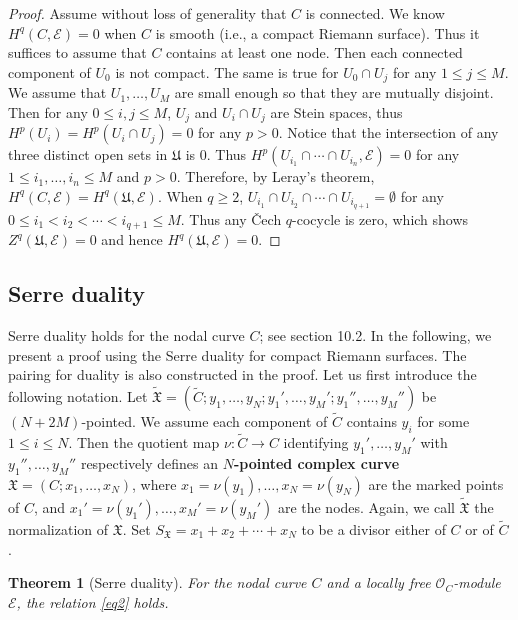 \documentclass[12pt,b5paper,notitlepage]{report}
\theoremstyle{definition}
\theoremstyle{plain}
\newtheorem{thm}[df]{Theorem}
\newcommand{\fk}{\mathfrak}
\newcommand{\wtd}{\widetilde}
\newcommand{\scr}{\mathscr}
\newcommand{\SX}{S_{\fk X}}
\numberwithin{equation}{section}
\begin{document}
\begin{proof}
Assume without loss of generality that $C$ is connected. We know  $H^q(C,\scr E)=0$ when $C$ is smooth (i.e., a compact Riemann surface). Thus it suffices to assume that $C$ contains at least one node. Then each connected component of $U_0$ is not compact. The same is true for $U_0\cap U_j$ for any $1\leq j\leq M$. We assume that $U_1,\dots,U_M$ are small enough so that they are mutually disjoint. Then for any $0\leq i,j\leq M$, $U_j$ and $U_i\cap U_j$ are Stein spaces, thus $H^p(U_i)=H^p(U_i\cap U_j)=0$ for any $p> 0$. Notice that the intersection of any three distinct open sets in $\fk U$ is $0$. Thus $H^p(U_{i_1}\cap\cdots \cap U_{i_n},\scr E)=0$ for any $1\leq i_1,\dots, i_n\leq M$ and $p>0$. Therefore, by Leray's theorem, $H^q(C,\scr E)=H^q(\fk U,\scr E)$. When $q\geq 2$, $U_{i_1}\cap U_{i_2}\cap\cdots\cap U_{i_{q+1}}=\emptyset $ for any $0\leq i_1<i_2<\cdots<i_{q+1}\leq M$. Thus any \v Cech $q$-cocycle is zero, which shows $Z^q(\fk U,\scr E)=0$ and hence $H^q(\fk U,\scr E)=0$.
\end{proof}








\subsection*{Serre duality}






Serre duality holds for the nodal curve $C$; see \cite{ACG11} section 10.2. In the following, we present a proof using the Serre duality for compact Riemann surfaces. The pairing for duality is also constructed in the proof. Let us first introduce the following notation. Let $\wtd{\fk X}=(\wtd C;y_1,\dots,y_N;y_1',\dots,y_M';y_1'',\dots,y_M'')$ be $(N+2M)$-pointed. We assume each component of $\wtd C$ contains $y_i$ for some $1\leq i\leq N$. Then the quotient map $\nu:\wtd C\rightarrow C$ identifying $y_1',\dots,y_M'$ with $y_1'',\dots,y_M''$ respectively defines an  \textbf{$N$-pointed complex curve} $\fk X=(C;x_1,\dots,x_N)$, where $x_1=\nu(y_1),\dots,x_N=\nu(y_N)$ are the marked points of $C$, and $x_1'=\nu(y_1'),\dots,x_M'=\nu(y_M')$ are the nodes. Again, we call $\wtd{\fk X}$ the normalization of $\fk X$. Set $\SX=x_1+x_2+\cdots+x_N$ to be a divisor either of $C$ or of $\wtd C$. 


\begin{thm}[Serre duality]\label{lb150}
For the nodal curve $C$ and a locally free $\scr O_C$-module $\scr E$, the relation \eqref{eq2} holds.
\end{thm}
\end{document}
